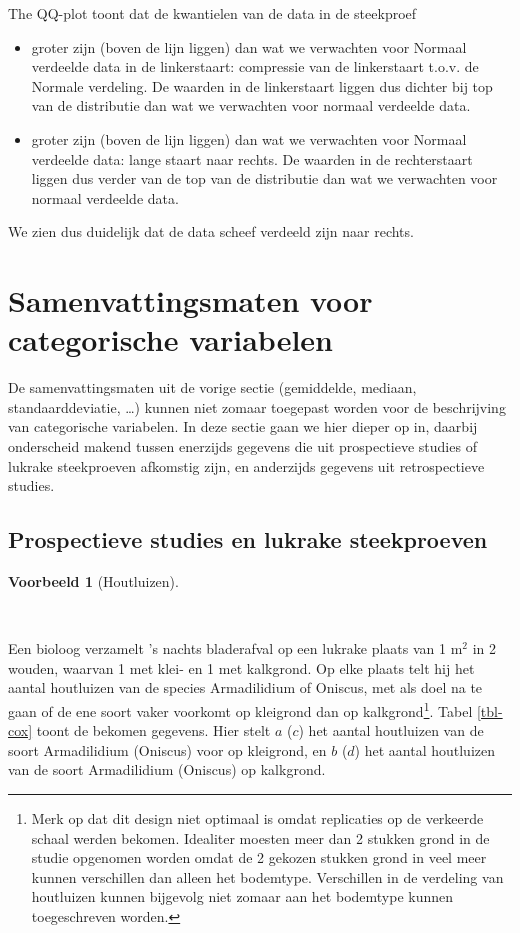 \documentclass[
  dutch,
  letterpaper,
  12pt]{book}
\theoremstyle{definition}
\theoremstyle{definition}
\theoremstyle{definition}
\newtheorem{example}{Voorbeeld}[chapter]
\theoremstyle{remark}
\begin{document}
The QQ-plot toont dat de kwantielen van de data in de steekproef

\begin{itemize}
\item
  groter zijn (boven de lijn liggen) dan wat we verwachten voor Normaal
  verdeelde data in de linkerstaart: compressie van de linkerstaart
  t.o.v. de Normale verdeling. De waarden in de linkerstaart liggen dus
  dichter bij top van de distributie dan wat we verwachten voor normaal
  verdeelde data.
\item
  groter zijn (boven de lijn liggen) dan wat we verwachten voor Normaal
  verdeelde data: lange staart naar rechts. De waarden in de
  rechterstaart liggen dus verder van de top van de distributie dan wat
  we verwachten voor normaal verdeelde data.
\end{itemize}

We zien dus duidelijk dat de data scheef verdeeld zijn naar rechts.

\section{Samenvattingsmaten voor categorische
variabelen}\label{sec-explCatVar}

De samenvattingsmaten uit de vorige sectie (gemiddelde, mediaan,
standaarddeviatie, \ldots) kunnen niet zomaar toegepast worden voor de
beschrijving van categorische variabelen. In deze sectie gaan we hier
dieper op in, daarbij onderscheid makend tussen enerzijds gegevens die
uit prospectieve studies of lukrake steekproeven afkomstig zijn, en
anderzijds gegevens uit retrospectieve studies.

\subsection{Prospectieve studies en lukrake
steekproeven}\label{prospectieve-studies-en-lukrake-steekproeven}

\begin{example}[Houtluizen]\protect\hypertarget{exm-houtluizen}{}\label{exm-houtluizen}

~

\end{example}

Een bioloog verzamelt 's nachts bladerafval op een lukrake plaats van 1
m\(^2\) in 2 wouden, waarvan 1 met klei- en 1 met kalkgrond. Op elke
plaats telt hij het aantal houtluizen van de species Armadilidium of
Oniscus, met als doel na te gaan of de ene soort vaker voorkomt op
kleigrond dan op kalkgrond\footnote{Merk op dat dit design niet optimaal
  is omdat replicaties op de verkeerde schaal werden bekomen. Idealiter
  moesten meer dan 2 stukken grond in de studie opgenomen worden omdat
  de 2 gekozen stukken grond in veel meer kunnen verschillen dan alleen
  het bodemtype. Verschillen in de verdeling van houtluizen kunnen
  bijgevolg niet zomaar aan het bodemtype kunnen toegeschreven worden.}.
Tabel \ref{tbl-cox} toont de bekomen gegevens. Hier stelt \(a\) (\(c\))
het aantal houtluizen van de soort Armadilidium (Oniscus) voor op
kleigrond, en \(b\) (\(d\)) het aantal houtluizen van de soort
Armadilidium (Oniscus) op kalkgrond.
\end{document}
